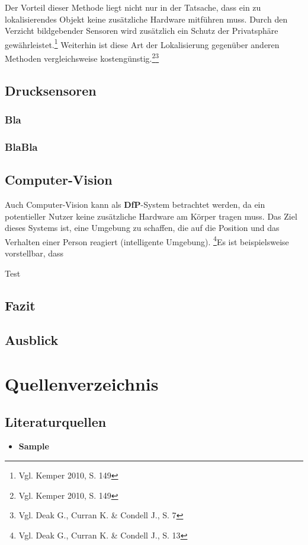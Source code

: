 Der Vorteil dieser Methode liegt nicht nur in der Tatsache, dass ein zu lokalisierendes Objekt keine zusätzliche Hardware mitführen muss. Durch den Verzicht bildgebender Sensoren wird zusätzlich ein Schutz der Privatsphäre gewährleistet.\footnote{Vgl. Kemper 2010, S. 149} Weiterhin ist diese Art der Lokalisierung gegenüber anderen Methoden vergleichsweise kostengünstig.\footnote{Vgl. Kemper 2010, S. 149}\footnote{Vgl. Deak G., Curran K. \& Condell J., S. 7}

\subsection{Drucksensoren}
\subsubsection{Bla}
\subsubsection{BlaBla}
\subsection{Computer-Vision}
Auch Computer-Vision kann als \textbf{DfP}-System betrachtet werden, da ein potentieller Nutzer keine zusätzliche Hardware am Körper tragen muss. Das Ziel dieses Systems ist, eine Umgebung zu schaffen, die auf die Position und das Verhalten einer Person reagiert (intelligente Umgebung). \footnote{Vgl. Deak G., Curran K. \& Condell J., S. 13}\newline Es ist beispielsweise vorstellbar, dass 

Test

\subsection{Fazit}

\subsection{Ausblick}

\newpage

\section{Quellenverzeichnis}
\subsection*{Literaturquellen}
\begin{itemize}[leftmargin=*]
\item[] \textbf{Sample}
\end{itemize}
